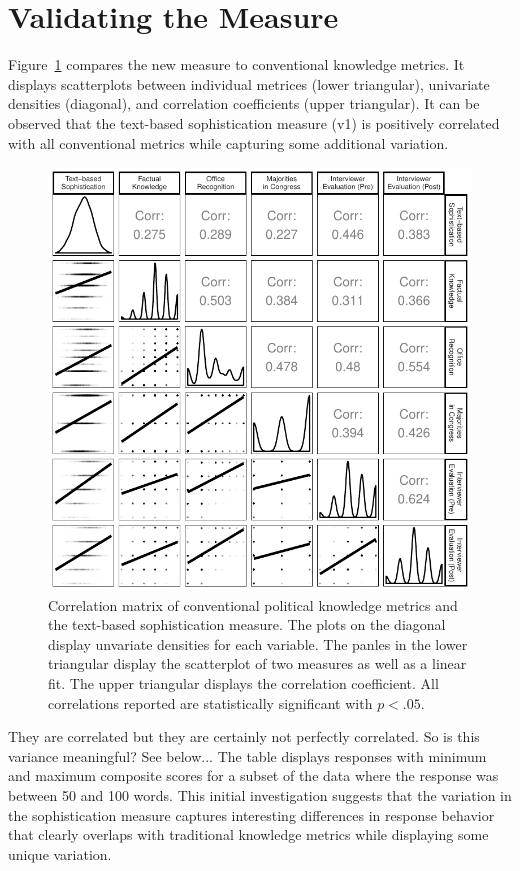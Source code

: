 \documentclass[12pt]{article}
\begin{document}
\section*{Validating the Measure}

Figure~\ref{fig:corplot} compares the new measure to conventional knowledge metrics. It  displays scatterplots between individual metrices (lower triangular), univariate densities (diagonal), and correlation coefficients (upper triangular). It can be observed that the text-based sophistication measure (v1) is positively correlated with all conventional metrics while capturing some additional variation.

\begin{figure}[h]\centering
\includegraphics{../fig/corplot.pdf}
\caption{Correlation matrix of conventional political knowledge metrics and the text-based sophistication measure. The plots on the diagonal display unvariate densities for each variable. The panles in the lower triangular display the scatterplot of two measures as well as a linear fit. The upper triangular displays the correlation coefficient. All correlations reported are statistically significant with $p<.05$.}\label{fig:corplot}
\end{figure}


They are correlated but they are certainly not perfectly correlated. So is this variance meaningful? See below... The table displays responses with minimum and maximum composite scores for a subset of the data where the response was between 50 and 100 words. This initial investigation suggests that the variation in the sophistication measure captures interesting differences in response behavior that clearly overlaps with traditional knowledge metrics while displaying some unique variation.
\end{document}
